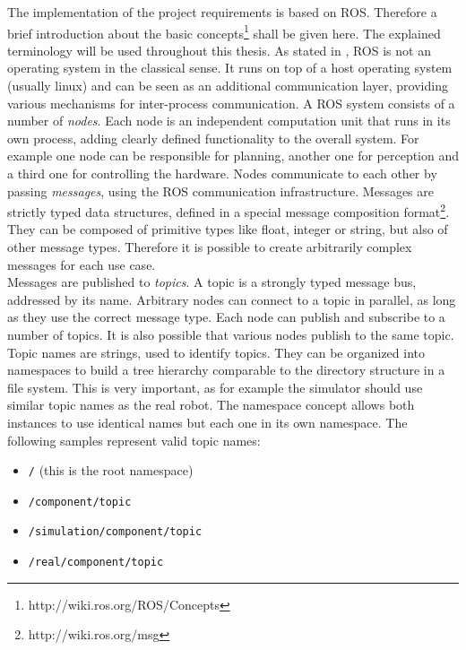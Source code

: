 The implementation of the project requirements is based on ROS. Therefore a brief introduction about the basic concepts\footnote{http://wiki.ros.org/ROS/Concepts} shall be given here. The explained terminology will be used throughout this thesis. As stated in \cite{quigley2009}, ROS is not an operating system in the classical sense. It runs on top of a host operating system (usually linux) and can be seen as an additional communication layer, providing various mechanisms for inter-process communication. A ROS system consists of a number of \emph{nodes}. Each node is an independent computation unit that runs in its own process, adding clearly defined functionality to the overall system. For example one node can be responsible for planning, another one for perception and a third one for controlling the hardware. Nodes communicate to each other by passing \emph{messages}, using the ROS communication infrastructure. Messages are strictly typed data structures, defined in a special message composition format\footnote{http://wiki.ros.org/msg}. They can be composed of primitive types like float, integer or string, but also of other message types. Therefore it is possible to create arbitrarily complex messages for each use case. \\

Messages are published to \emph{topics}. A topic is a strongly typed message bus, addressed by its name. Arbitrary nodes can connect to a topic in parallel, as long as they use the correct message type. Each node can publish and subscribe to a number of topics. It is also possible that various nodes publish to the same topic. Topic names are strings, used to identify topics. They can be organized into namespaces to build a tree hierarchy comparable to the directory structure in a file system. This is very important, as for example the simulator should use similar topic names as the real robot. The namespace concept allows both instances to use identical names but each one in its own namespace. The following samples represent valid topic names:
\begin{itemize}
\item \texttt{/} (this is the root namespace)
\item \texttt{/component/topic}
\item \texttt{/simulation/component/topic}
\item \texttt{/real/component/topic}
\end{itemize}

